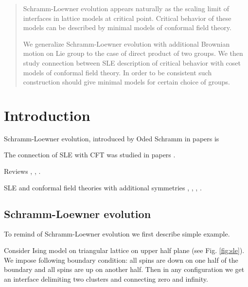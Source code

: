 \begin{abstract}
  Schramm-Loewner evolution appears naturally as the scaling limit of interfaces in lattice models at critical point. Critical behavior of these models can be described by minimal models of conformal field theory.

  We generalize Schramm-Loewner evolution with additional Brownian motion on Lie group to the case of direct product of two groups. We then study connection between SLE description of critical behavior with coset models of conformal field theory. In order to be consistent such construction should give minimal models for certain choice of groups. 

\end{abstract}

\section{Introduction}
Schramm-Loewner evolution, introduced by Oded Schramm in papers \cite{schramm2000scaling} is 

The connection of SLE with CFT was studied in papers \cite{bauer2004conformal,bauer2004cfts,bauer2003sle,bauer2002sle}.

Reviews \cite{rohde2005basic}, \cite{bauer20062d}, \cite{Cardy:2005kh}. 

SLE and conformal field theories with additional symmetries \cite{alekseev2010sle}, \cite{santachiara2008sle,picco2008numerical}, \cite{bettelheim2005stochastic}, \cite{Rasmussen:2004xr}.

\subsection{Schramm-Loewner evolution}
To remind of Schramm-Loewner evolution we first describe simple example.

Consider Ising model on triangular lattice on upper half plane (see Fig. \ref{fig:sle}). We impose following boundary condition: all spins are down on one half of the boundary and all spins are up on another half. Then in any configuration we get an interface delimiting two clusters and connecting zero and infinity. 

